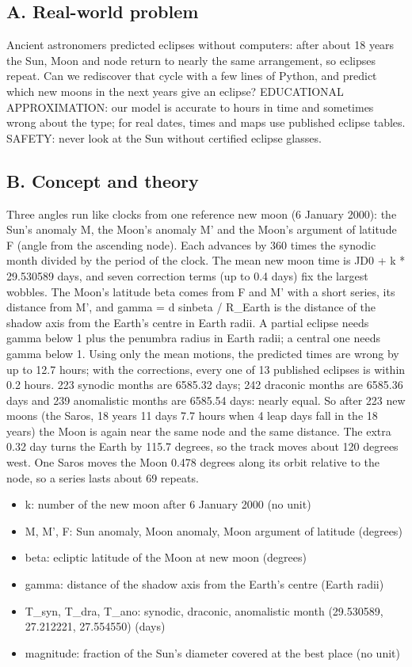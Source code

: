 \documentclass[11pt,a4paper]{article}
\begin{document}
\subsection*{A. Real-world problem}
Ancient astronomers predicted eclipses without computers: after about 18 years the Sun, Moon and node return to nearly the same arrangement, so eclipses repeat. Can we rediscover that cycle with a few lines of Python, and predict which new moons in the next years give an eclipse? EDUCATIONAL APPROXIMATION: our model is accurate to hours in time and sometimes wrong about the type; for real dates, times and maps use published eclipse tables. SAFETY: never look at the Sun without certified eclipse glasses.

\subsection*{B. Concept and theory}
Three angles run like clocks from one reference new moon (6 January 2000): the Sun's anomaly M, the Moon's anomaly M' and the Moon's argument of latitude F (angle from the ascending node). Each advances by 360 times the synodic month divided by the period of the clock. The mean new moon time is JD0 + k * 29.530589 days, and seven correction terms (up to 0.4 days) fix the largest wobbles. The Moon's latitude beta comes from F and M' with a short series, its distance from M', and gamma = d sin\textbar{}beta\textbar{} / R\_Earth is the distance of the shadow axis from the Earth's centre in Earth radii. A partial eclipse needs gamma below 1 plus the penumbra radius in Earth radii; a central one needs gamma below 1. Using only the mean motions, the predicted times are wrong by up to 12.7 hours; with the corrections, every one of 13 published eclipses is within 0.2 hours. 223 synodic months are 6585.32 days; 242 draconic months are 6585.36 days and 239 anomalistic months are 6585.54 days: nearly equal. So after 223 new moons (the Saros, 18 years 11 days 7.7 hours when 4 leap days fall in the 18 years) the Moon is again near the same node and the same distance. The extra 0.32 day turns the Earth by 115.7 degrees, so the track moves about 120 degrees west. One Saros moves the Moon 0.478 degrees along its orbit relative to the node, so a series lasts about 69 repeats.

\begin{itemize}[nosep]
\item k: number of the new moon after 6 January 2000 (no unit)
\item M, M', F: Sun anomaly, Moon anomaly, Moon argument of latitude (degrees)
\item beta: ecliptic latitude of the Moon at new moon (degrees)
\item gamma: distance of the shadow axis from the Earth's centre (Earth radii)
\item T\_syn, T\_dra, T\_ano: synodic, draconic, anomalistic month (29.530589, 27.212221, 27.554550) (days)
\item magnitude: fraction of the Sun's diameter covered at the best place (no unit)
\end{itemize}
\end{document}
